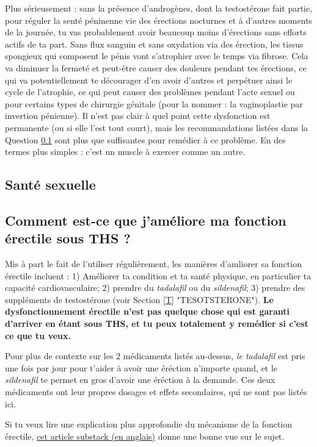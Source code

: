 \documentclass{article}
\begin{document}
Plus sérieusement : sans la présence d'androgènes, dont la testostérone fait partie, pour réguler la senté péninenne vie des érections nocturnes et à d'autres moments de la journée, tu vas probablement avoir beaucoup moins d'érections sans efforts actifs de ta part. Sans flux sanguin et sans oxydation via des érection, les tissus spongieux qui composent le pénis vont s'atrophier avec le temps via fibrose. Cela va diminuer la fermeté et peut-être causer des douleurs pendant tes érections, ce qui va potentiellement te décourager d'en avoir d'autres et perpétuer ainsi le cycle de l'atrophie, ce qui peut causer des problèmes pendant l'acte sexuel ou pour certains types de chirurgie génitale (pour la nommer : la vaginoplastie par invertion pénienne). Il n'est pas clair à quel point cette dysfonction est permanente (ou si elle l'est tout court), mais les recommandations listées dans la Question \ref{11-20} sont plus que suffisantes pour remédier à ce problème. En des termes plus simples : c'est un muscle à exercer comme un autre.

\subsection*{Santé sexuelle}

\subsection{Comment est-ce que j'améliore ma fonction érectile sous THS ?}\label{11-20}

Mis à part le fait de l'utiliser régulièrement, les manières d'amliorer sa fonction érectile incluent : 1) Améliorer ta condition et ta santé physique, en particulier ta capacité cardiovasculaire; 2) prendre du \textit{tadalafil} ou du \textit{sildenafil}; 3) prendre des suppléments de testostérone (voir Section \ref{T} "TESOTSTERONE"). \textbf{Le dysfonctionnement érectile n'est pas quelque chose qui est garanti d'arriver en étant sous THS, et tu peux totalement y remédier si c'est ce que tu veux.}

Pour plus de contexte sur les 2 médicaments listés au-dessus, \textit{le tadalafil} est pris une fois par jour pour t'aider à avoir une éréction n'importe quand, et le \textit{sildenafil} te permet en gros d'avoir une éréction à la demande. Ces deux médicaments ont leur propres dosages et effets secondaires, qui ne sont pas listés ici.

Si tu veux lire une explication plus approfondie du mécanisme de la fonction érectile, \href{https://stainedglasswoman.substack.com/p/how-to-maintain-your-penis-function}{cet article substack (en anglais)} donne une bonne vue sur le sujet.
\end{document}
